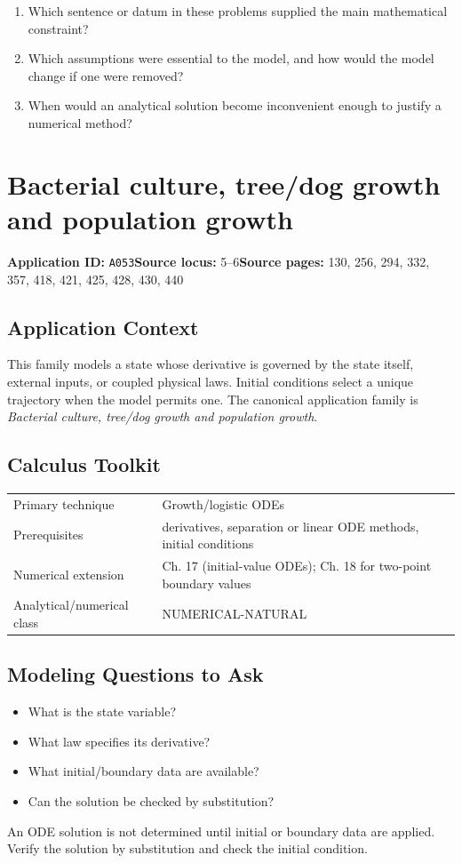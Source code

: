 \documentclass[11pt]{book}
\newcommand{\pid}[1]{\texttt{#1}}
\begin{document}
\begin{reflectionbox}\begin{enumerate}
\item Which sentence or datum in these problems supplied the main mathematical constraint?
\item Which assumptions were essential to the model, and how would the model change if one were removed?
\item When would an analytical solution become inconvenient enough to justify a numerical method?
\end{enumerate}\end{reflectionbox}
\chapter{Bacterial culture, tree/dog growth and population growth}\label{app:A053}
\textbf{Application ID:} \pid{A053}\quad \textbf{Source locus:} 5–6\quad \textbf{Source pages:} 130, 256, 294, 332, 357, 418, 421, 425, 428, 430, 440
\section*{Application Context}
This family models a state whose derivative is governed by the state itself, external inputs, or coupled physical laws. Initial conditions select a unique trajectory when the model permits one. The canonical application family is \emph{Bacterial culture, tree/dog growth and population growth}.
\section*{Calculus Toolkit}
\begin{tabularx}{\textwidth}{@{}lX@{}}\toprule
Primary technique & Growth/logistic ODEs \\
Prerequisites & derivatives, separation or linear ODE methods, initial conditions \\
Numerical extension & Ch. 17 (initial-value ODEs); Ch. 18 for two-point boundary values \\
Analytical/numerical class & NUMERICAL-NATURAL \\
\bottomrule\end{tabularx}
\section*{Modeling Questions to Ask}\begin{itemize}
\item What is the state variable?
\item What law specifies its derivative?
\item What initial/boundary data are available?
\item Can the solution be checked by substitution?
\end{itemize}
\begin{errorbox}An ODE solution is not determined until initial or boundary data are applied. Verify the solution by substitution and check the initial condition.\end{errorbox}
\end{document}
